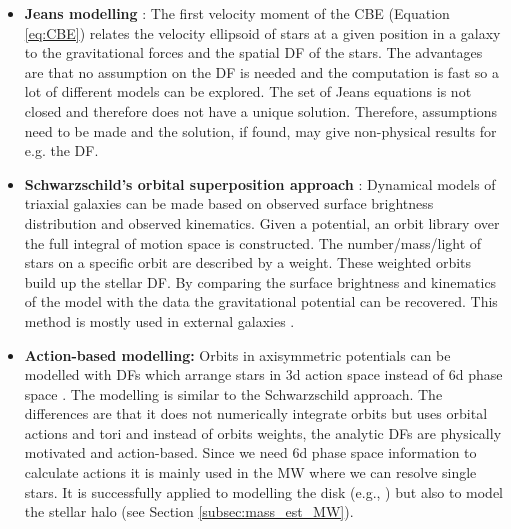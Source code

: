 \begin{itemize}
    \item \textbf{Jeans modelling} \citep{Jeans.....1915}: The first velocity moment of the \ac{CBE} (Equation \ref{eq:CBE}) relates the velocity ellipsoid of stars at a given position in a galaxy to the gravitational forces and the spatial \ac{DF} of the stars. The advantages are that no assumption on the \ac{DF} is needed and the computation is fast so a lot of different models can be explored. The set of Jeans equations is not closed and therefore does not have a unique solution. Therefore, assumptions need to be made and the solution, if found, may give non-physical results for e.g. the \ac{DF}. 
    \item \textbf{Schwarzschild's orbital superposition approach} \citep{Schwarzschild...1979}: Dynamical models of triaxial galaxies can be made based on observed surface brightness distribution and observed kinematics. Given a potential, an orbit library over the full integral of motion space is constructed. The number/mass/light of stars on a specific orbit are described by a weight. These weighted orbits build up the stellar \ac{DF}. By comparing the surface brightness and kinematics of the model with the data the gravitational potential can be recovered. This method is mostly used in external galaxies \citep{Rix...Schwarzschild...1997, vdBosch...Schwarzschild...2008, Vasiliev...Schwarzschild...2013, Ling...Schwarzschild...2018}.
    \item \textbf{Action-based modelling:} Orbits in axisymmetric potentials can be modelled with \acp{DF} which arrange stars in 3d action space instead of 6d phase space \citep{Binney...actionbasedmodelling...2012, Bovy...actionbasedmodelling...2013}. The modelling is similar to the Schwarzschild approach. The differences are that it does not numerically integrate orbits but uses orbital actions and tori and instead of orbits weights, the analytic \acp{DF} are physically motivated and action-based. Since we need 6d phase space information to calculate actions it is mainly used in the \ac{MW} where we can resolve single stars. It is successfully applied to modelling the disk (e.g., \citealt{trick...ROADMAPPING...2016, Wilmathesis}) but also to model the stellar halo (see Section \ref{subsec:mass_est_MW}). 
\end{itemize}
